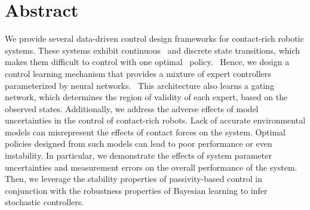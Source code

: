 \chapter*{Abstract}

We provide several data-driven control design frameworks for contact-rich
robotic systems.
%
These systems exhibit continuous~ and discrete state transitions, which makes
them difficult to control with one optimal~
policy.~
%
Hence, we design a control learning mechanism that provides a mixture of expert
controllers parameterized by neural networks.~ 
%
This architecture also learns a gating network, which determines the region of
validity of each expert, based on the observed states.
%
Additionally, we address the adverse effects of model uncertainties in the
control of contact-rich robots.
%
Lack of accurate environmental models can misrepresent the effects of contact
forces on the system.
%
Optimal policies designed from such models can lead to poor performance or even
instability.
%
In particular, we demonstrate the effects of system parameter uncertainties and 
measurement errors on the overall performance of the system.
%
Then, we leverage the stability properties of passivity-based control in
conjunction with the robustness properties of Bayesian learning to
infer~
stochastic controllers.
%


